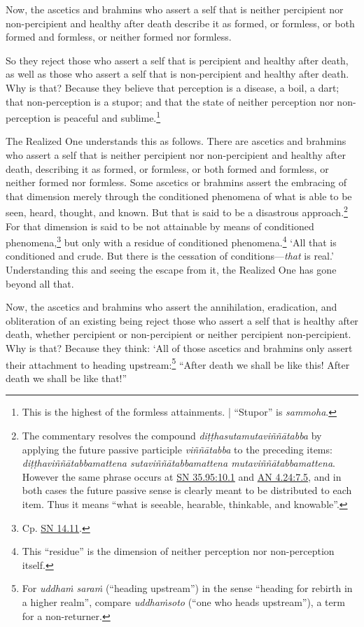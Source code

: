 \documentclass[12pt,openany]{book}%
\begin{document}
Now, the ascetics and brahmins who assert a self that is neither percipient nor non-percipient and healthy after death describe it as formed, or formless, or both formed and formless, or neither formed nor formless. 

So they reject those who assert a self that is percipient and healthy after death, as well as those who assert a self that is non-percipient and healthy after death. Why is that? Because they believe that perception is a disease, a boil, a dart; that non-perception is a stupor; and that the state of neither perception nor non-perception is peaceful and sublime.\footnote{This is the highest of the formless attainments. | “Stupor” is \textit{sammoha}. } 

The Realized One understands this as follows. There are ascetics and brahmins who assert a self that is neither percipient nor non-percipient and healthy after death, describing it as formed, or formless, or both formed and formless, or neither formed nor formless. Some ascetics or brahmins assert the embracing of that dimension merely through the conditioned phenomena of what is able to be seen, heard, thought, and known. But that is said to be a disastrous approach.\footnote{The commentary resolves the compound \textit{\textsanskrit{diṭṭhasutamutaviññātabba}} by applying the future passive participle \textit{\textsanskrit{viññātabba}} to the preceding items: \textit{\textsanskrit{diṭṭhaviññātabbamattena} \textsanskrit{sutaviññātabbamattena} \textsanskrit{mutaviññātabbamattena}}. However the same phrase occurs at \href{https://suttacentral.net/sn35.95/en/sujato\#10.1}{SN 35.95:10.1} and \href{https://suttacentral.net/an4.24/en/sujato\#7.5}{AN 4.24:7.5}, and in both cases the future passive sense is clearly meant to be distributed to each item. Thus it means “what is seeable, hearable, thinkable, and knowable”. } For that dimension is said to be not attainable by means of conditioned phenomena,\footnote{Cp. \href{https://suttacentral.net/sn14.11/en/sujato}{SN 14.11}. } but only with a residue of conditioned phenomena.\footnote{This “residue” is the dimension of neither perception nor non-perception itself. } ‘All that is conditioned and crude. But there is the cessation of conditions—\emph{that} is real.’ Understanding this and seeing the escape from it, the Realized One has gone beyond all that. 

Now, the ascetics and brahmins who assert the annihilation, eradication, and obliteration of an existing being reject those who assert a self that is healthy after death, whether percipient or non-percipient or neither percipient non-percipient. Why is that? Because they think: ‘All of those ascetics and brahmins only assert their attachment to heading upstream:\footnote{For \textit{\textsanskrit{uddhaṁ} \textsanskrit{saraṁ}} (“heading upstream”) in the sense “heading for rebirth in a higher realm”, compare \textit{\textsanskrit{uddhaṁsoto}} (“one who heads upstream”), a term for a non-returner. } “After death we shall be like this! After death we shall be like that!” 
\end{document}
